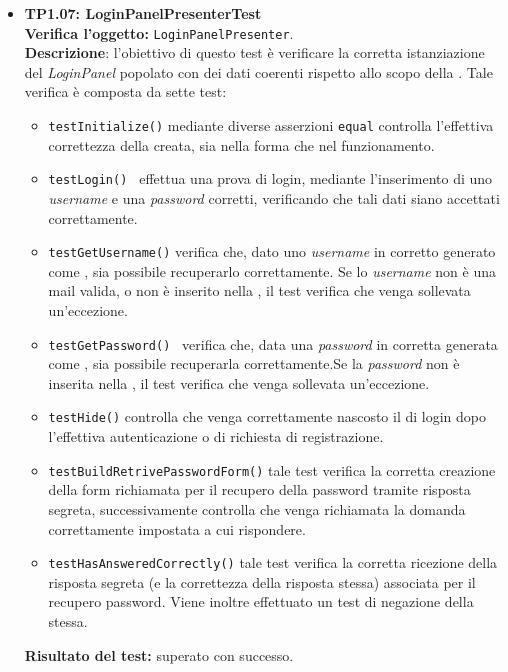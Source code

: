 \begin{itemize}
\item \textbf{TP1.07: LoginPanelPresenterTest}\\
\textbf{Verifica l'oggetto:} \texttt{LoginPanelPresenter}.\\
\textbf{Descrizione}: l'obiettivo di questo test è verificare la corretta istanziazione del \textit{LoginPanel} popolato con dei dati coerenti rispetto allo scopo della .
Tale verifica è composta da sette test:
\begin{itemize} 
\item \texttt{testInitialize()} mediante diverse asserzioni \texttt{equal} controlla l'effettiva correttezza della  creata, sia nella forma che nel funzionamento.
\item \texttt{testLogin() } effettua una prova di login, mediante l'inserimento di uno \textit{username} e una \textit{password} corretti, verificando che tali dati siano accettati correttamente.
\item \texttt{testGetUsername()} verifica che, dato uno \textit{username} in  corretto generato come , sia possibile recuperarlo correttamente. Se lo \textit{username} non è una mail valida, o non è inserito nella , il test verifica che venga sollevata un'eccezione.
\item \texttt{testGetPassword() } verifica che, data una \textit{password} in  corretta generata come , sia possibile recuperarla correttamente.Se la \textit{password} non è inserita nella , il test verifica che venga sollevata un'eccezione.
\item \texttt{testHide()} controlla che venga correttamente nascosto il  di login dopo l'effettiva autenticazione o di richiesta di registrazione.
\item \texttt{testBuildRetrivePasswordForm()} tale test verifica la corretta creazione della form richiamata per il recupero della password tramite risposta segreta, successivamente controlla che venga richiamata la domanda correttamente impostata a cui rispondere.
\item \texttt{testHasAnsweredCorrectly()} tale test verifica la corretta ricezione della risposta segreta (e la correttezza della risposta stessa) associata per il recupero password. Viene inoltre effettuato un test di negazione della stessa.
\end{itemize}
\textbf{Risultato del test:} superato con successo.


\end{itemize}
